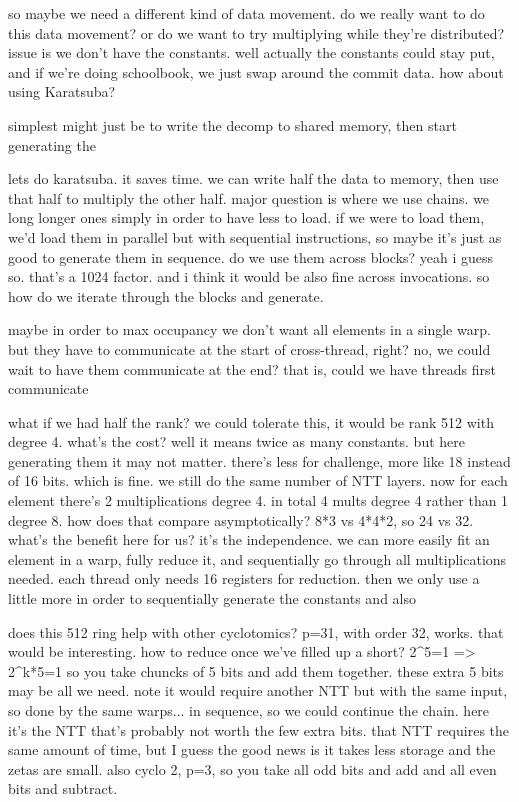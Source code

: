 so maybe we need a different kind of data movement. 
do we really want to do this data movement?
or do we want to try multiplying while they're distributed?
issue is we don't have the constants. well actually the constants could stay put, and if we're doing schoolbook, we just swap around the commit data. 
how about using Karatsuba? 

simplest might just be to write the decomp to shared memory, then start generating the 

lets do karatsuba. it saves time. we can write half the data to memory, then use that half to multiply the other half. 
major question is where we use chains. we long longer ones simply in order to have less to load. if we were to load them, we'd load them in parallel but with sequential instructions, so maybe it's just as good to generate them in sequence. do we use them across blocks? yeah i guess so. that's a 1024 factor. and i think it would be also fine across invocations.
so how do we iterate through the blocks and generate. 

maybe in order to max occupancy we don't want all elements in a single warp. 
but they have to communicate at the start of cross-thread, right? no, we could wait to have them communicate at the end? that is, could we have threads first communicate 

what if we had half the rank?
we could tolerate this, it would be rank 512 with degree 4. 
what's the cost? well it means twice as many constants. but here generating them it may not matter.
there's less for challenge, more like 18 instead of 16 bits. which is fine. we still do the same number of NTT layers. now for each element there's 2 multiplications degree 4. in total 4 mults degree 4 rather than 1 degree 8. how does that compare asymptotically? 8*3 vs 4*4*2, so 24 vs 32.
what's the benefit here for us?
it's the independence. we can more easily fit an element in a warp, fully reduce it, and sequentially go through all multiplications needed. each thread only needs 16 registers for reduction. then we only use a little more in order to sequentially generate the constants and also 

does this 512 ring help with other cyclotomics? p=31, with order 32, works. that would be interesting. how to reduce once we've filled up a short? 2^5=1 => 2^{k*5}=1 so you take chuncks of 5 bits and add them together.
these extra 5 bits may be all we need. 
note it would require another NTT but with the same input, so done by the same warps... in sequence, so we could continue the chain. 
here it's the NTT that's probably not worth the few extra bits. that NTT requires the same amount of time, but I guess the good news is it takes less storage and the zetas are small.
also cyclo 2, p=3, so you take all odd bits and add and all even bits and subtract.

